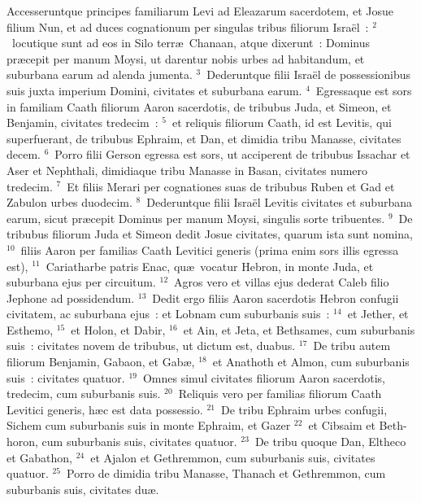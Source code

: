 \lettrine[lines=3,image=true,loversize=0.05,lraise=-0.03]{A}{}ccesseruntque principes familiarum Levi ad Eleazarum sacerdotem, et Josue filium Nun, et ad duces cognationum per singulas tribus filiorum Isra\"el~:
${}^{2}$~locutique sunt ad eos in Silo terr\ae\ Chanaan, atque dixerunt~: Dominus pr\ae cepit per manum Moysi, ut darentur nobis urbes ad habitandum, et suburbana earum ad alenda jumenta.
${}^{3}$~Dederuntque filii Isra\"el de possessionibus suis juxta imperium Domini, civitates et suburbana earum.
${}^{4}$~Egressaque est sors in familiam Caath filiorum Aaron sacerdotis, de tribubus Juda, et Simeon, et Benjamin, civitates tredecim~:
${}^{5}$~et reliquis filiorum Caath, id est Levitis, qui superfuerant, de tribubus Ephraim, et Dan, et dimidia tribu Manasse, civitates decem.
${}^{6}$~Porro filii Gerson egressa est sors, ut acciperent de tribubus Issachar et Aser et Nephthali, dimidiaque tribu Manasse in Basan, civitates numero tredecim.
${}^{7}$~Et filiis Merari per cognationes suas de tribubus Ruben et Gad et Zabulon urbes duodecim.
${}^{8}$~Dederuntque filii Isra\"el Levitis civitates et suburbana earum, sicut pr\ae cepit Dominus per manum Moysi, singulis sorte tribuentes.
${}^{9}$~De tribubus filiorum Juda et Simeon dedit Josue civitates, quarum ista sunt nomina,
${}^{10}$~filiis Aaron per familias Caath Levitici generis (prima enim sors illis egressa est),
${}^{11}$~Cariatharbe patris Enac, qu\ae\ vocatur Hebron, in monte Juda, et suburbana ejus per circuitum.
${}^{12}$~Agros vero et villas ejus dederat Caleb filio Jephone ad possidendum.
${}^{13}$~Dedit ergo filiis Aaron sacerdotis Hebron confugii civitatem, ac suburbana ejus~: et Lobnam cum suburbanis suis~:
${}^{14}$~et Jether, et Esthemo,
${}^{15}$~et Holon, et Dabir,
${}^{16}$~et Ain, et Jeta, et Bethsames, cum suburbanis suis~: civitates novem de tribubus, ut dictum est, duabus.
${}^{17}$~De tribu autem filiorum Benjamin, Gabaon, et Gab\ae ,
${}^{18}$~et Anathoth et Almon, cum suburbanis suis~: civitates quatuor.
${}^{19}$~Omnes simul civitates filiorum Aaron sacerdotis, tredecim, cum suburbanis suis.
${}^{20}$~Reliquis vero per familias filiorum Caath Levitici generis, h\ae c est data possessio.
${}^{21}$~De tribu Ephraim urbes confugii, Sichem cum suburbanis suis in monte Ephraim, et Gazer
${}^{22}$~et Cibsaim et Beth-horon, cum suburbanis suis, civitates quatuor.
${}^{23}$~De tribu quoque Dan, Eltheco et Gabathon,
${}^{24}$~et Ajalon et Gethremmon, cum suburbanis suis, civitates quatuor.
${}^{25}$~Porro de dimidia tribu Manasse, Thanach et Gethremmon, cum suburbanis suis, civitates du\ae .
